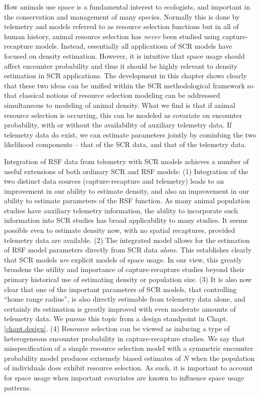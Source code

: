 How animals use space is a fundamental interest to ecologists, and
important in the conservation and management of many species.
Normally this is done by telemetry and models referred to as resource
selection functions \citep{manly_etal:2002} but in all of human
history, animal resource selection has {\it never} been studied using
capture-recapture models. Instead, essentially all applicatiosn of SCR
models have focused on density estimation.  However, it is intuitive
that space usage should affect encounter probability and thus it
should be highly relevant to density estimation in SCR
applications. The development in this chapter shows clearly that these
two ideas can be unified within the SCR methodological framework so
that classical notions of resource selection modeling can be
addresssed simultaneous to modeling of animal density. What we find is
that if animal resource selection is occurring, this can be modeled as
covariate on encounter probability, with or without the availability
of auxiliary telemetry data. If telemetry data do exist, we can
estimate parameters jointly by cominbing the two likelihood components
-- that of the SCR data, and that of the telemetry data.


Integration of RSF data from telemetry with SCR models achieves a
number of useful extensions of both ordinary SCR and RSF models: (1)
Integration of the two distinct data sources (capture-recapture and
telemetry) leads to an improvement in our ability to estimate density,
and also an improvement in our ability to estimate parameters of the
RSF function.  As many animal population studies have auxiliary
telemetry information, the ability to incorporate such information
into SCR studies has broad applicability to many studies.  It seems
possible even to estimate density now, with no spatial recaptures,
provided telemetry data are available.  (2) The integrated model
allows for the estimation of RSF model parameters directly from SCR
data {\it alone}.  This establishes clearly that SCR models {\it are}
explicit models of space usage. In our view, this greatly broadens the
utility and importance of capture-recapture studies beyond their
primary historical use of estimating density or population size.  (3)
It is also now clear that one of the important parameters of SCR
models, that controlling ``home range radius'', is also directly
estimable from telemetry data alone, and certainly its estimation is
greatly improved with even moderate amounts of telemetry data. We
pursue this topic from a design standpoint in
Chapt. \ref{chapt.design}.  (4) Resource selection can be viewed as
inducing a type of heterogeneous encounter probability in
capture-recapture studies.  We say \citep{royle_etal:2012mee} that
misspecification of a simple resource selection model with a symmetric
encounter probability model produces extremely biased estimates of $N$
when the population of individuals does exhibit resource selection.
As such, it is important to account for space usage when important
covariates are known to influence space usage patterns.


